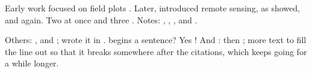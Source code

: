 \documentclass{article}
\begin{document}
Early work focused on field plots \citep{smith1990}. Later,
\citet{jones2005} introduced remote sensing, as \cite{lee2010} showed, and
\cite[p.~4]{lee2010} again. Two at once \citep{smith1990,jones2005} and three
\citet{a, b,c}. Notes: \citep[see][p.~12]{smith1990}, \citep[p.~3]{jones2005},
\citep[e.g.][]{lee2010}, \citet[ch.~2]{lee2010} and \citet*{lee2010}.

Others: \citealt{a}, \citealp{a} and \citealp[p.~1]{a}; \citeauthor{a} wrote
it in \citeyear{a} \citeyearpar{a}.  begins a sentence? Yes \citep{a}!
And \citet{a}: then \citep{a}; more text to fill the line out so that it
breaks somewhere after the citations, which keeps going for a while longer.


\end{document}
